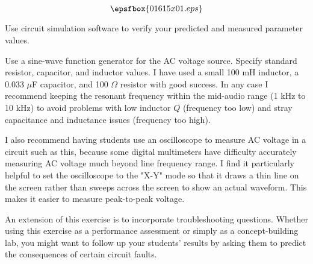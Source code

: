

$$\epsfbox{01615x01.eps}$$

\vfil \eject






Use circuit simulation software to verify your predicted and measured parameter values.







Use a sine-wave function generator for the AC voltage source.  Specify standard resistor, capacitor, and inductor values.  I have used a small 100 mH inductor, a 0.033 $\mu$F capacitor, and 100 $\Omega$ resistor with good success.  In any case I recommend keeping the resonant frequency within the mid-audio range (1 kHz to 10 kHz) to avoid problems with low inductor $Q$ (frequency too low) and stray capacitance and inductance issues (frequency too high).

I also recommend having students use an oscilloscope to measure AC voltage in a circuit such as this, because some digital multimeters have difficulty accurately measuring AC voltage much beyond line frequency range.  I find it particularly helpful to set the oscilloscope to the "X-Y" mode so that it draws a thin line on the screen rather than sweeps across the screen to show an actual waveform.  This makes it easier to measure peak-to-peak voltage.

An extension of this exercise is to incorporate troubleshooting questions.  Whether using this exercise as a performance assessment or simply as a concept-building lab, you might want to follow up your students' results by asking them to predict the consequences of certain circuit faults.




